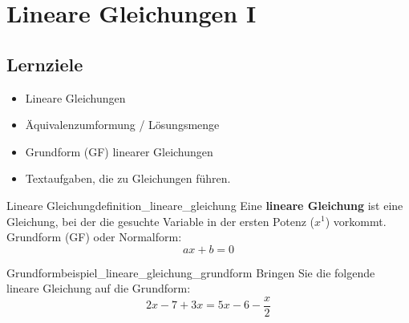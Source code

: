 %

\section{Lineare Gleichungen I}\label{gleichungen_lineare}

\subsection*{Lernziele}

\begin{itemize}
\item Lineare Gleichungen
\item Äquivalenzumformung / Lösungsmenge
\item Grundform (GF) linearer Gleichungen
\item Textaufgaben, die zu Gleichungen führen.
\end{itemize}

\noTRAINER{\vspace{10mm}}

\begin{definition}{Lineare Gleichung}{definition_lineare_gleichung}
  Eine \textbf{lineare Gleichung} ist eine Gleichung, bei der die
  gesuchte Variable in der ersten Potenz ($x^1$) vorkommt.\\
  Grundform (GF) oder Normalform:\\
  $$ax+b=0$$
  \end{definition}

\begin{beispiel}{Grundform}{beispiel_lineare_gleichung_grundform}
  Bringen Sie die folgende lineare Gleichung auf die Grundform:
  $$2x-7+3x = 5x-6-\frac{x}{2}$$
  \end{beispiel}


